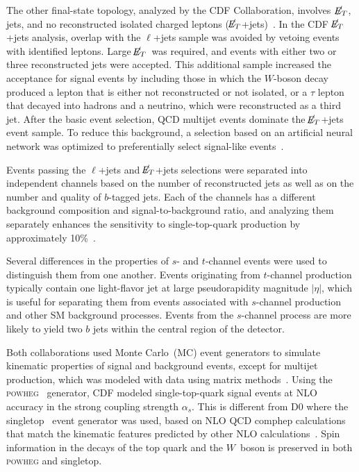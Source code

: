 \documentclass[aps,prl,twocolumn,showpacs,superscriptaddress,groupedaddress]{revtex4}  %
\newcommand{\MET}{\mbox{$\raisebox{.3ex}{$\not\!$}E_T$}}
\newcommand{\ljets}     {\mbox{$\ell$+jets}\xspace}
\newcommand{\comphep}   {\sc comphep}
\newcommand{\singletop} {\sc singletop}
\begin{document}
The other final-state topology, analyzed by the CDF Collaboration,
involves~\MET, jets, and no reconstructed isolated charged leptons
(\MET+jets)~\cite{cdf_channels}. In the CDF \MET+jets analysis,
overlap with the \ljets sample was avoided by vetoing events with
identified leptons.  Large \MET\ was required, and events with either
two or three reconstructed jets were accepted. This additional sample
increased the acceptance for signal events by including those in which
the $W$-boson decay produced a lepton that is either not reconstructed
or not isolated, or a $\tau$ lepton that decayed into hadrons and a
neutrino, which were reconstructed as a third jet.  After the basic
event selection, QCD multijet events dominate the \MET+jets event
sample. To reduce this background, a selection based on an artificial
neural network was optimized to preferentially select signal-like
events~\cite{cdf_channels}.

Events passing the \ljets and \MET+jets selections were separated into
independent channels based on the number of reconstructed jets as well
as on the number and quality of $b$-tagged jets.  Each of the channels
has a different background composition and signal-to-background ratio,
and analyzing them separately enhances the sensitivity to
single-top-quark production by approximately
10\%~\cite{cdf_channels,d0_schannel}.  

Several differences in the properties of $s$- and $t$-channel events
were used to distinguish them from one another.  Events originating
from $t$-channel production typically contain one light-flavor jet at
large pseudorapidity magnitude $|\eta|$, which is useful for
separating them from events associated with $s$-channel production and
other SM background processes. Events from the $s$-channel process are
more likely to yield two $b$ jets within the central region of the detector.





Both collaborations used Monte Carlo~(MC) event generators to simulate
kinematic properties of signal and background events, except for
multijet production, which was modeled with data using matrix
methods~\cite{cdf_matrix_method,d0-prd-2008}. 
Using the \textsc{powheg}~\cite{POWHEG2009} generator, CDF modeled
single-top-quark signal events at NLO accuracy in the strong coupling
strength $\alpha _s$. This is different from D0 where the
{\singletop}~\cite{singletop-mcgen} event generator was used, based on
NLO QCD {\comphep} calculations that match the 
kinematic features predicted by other NLO
calculations~\cite{singletop-xsec-sullivan,Campbell:2009ss}. Spin
information in the decays of the top quark and the $W$~boson is
preserved in both \textsc{powheg} and {\singletop}. 
\end{document}

